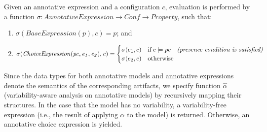 
\begin{definition}
\label{defn:sigma}
Given an annotative expression and a configuration $c$, evaluation is performed by a function $\mathit{\sigma:AnnotativeExpression \to Conf \to Property}$, such that:
\begin{enumerate}
    \item $\mathit{\sigma(BaseExpression(p),c) = p}$; and
    \item $\mathit{\sigma(ChoiceExpression(pc,e_1,e_2),c)} = \begin{cases}
            \sigma(e_1,c) &\mbox{if} \; c \models pc  \quad \text{\textit{(presence condition is satisfied)}} \\
            \sigma(e_2,c) &\mbox{otherwise}
        \end{cases}$
\end{enumerate}
\end{definition}

Since the data types for both annotative models and annotative expressions denote the semantics of the corresponding artifacts, we specify function $\hat{\alpha}$ (variability-aware analysis on annotative models) by recursively mapping their structures. %
In the case that the model has no variability, a  variability-free expression (i.e., the result of applying $\alpha$ to the model) is returned. Otherwise, an annotative choice expression is yielded.

